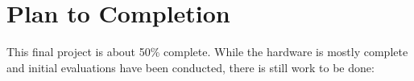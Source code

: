 \documentclass [11pt, proquest] {uwthesis}[2020/02/24]
\begin{document}

\chapter{Plan to Completion}

This final project is about 50\% complete. While the hardware is mostly complete and initial evaluations have been conducted, there is still work to be done:






\end{document}
